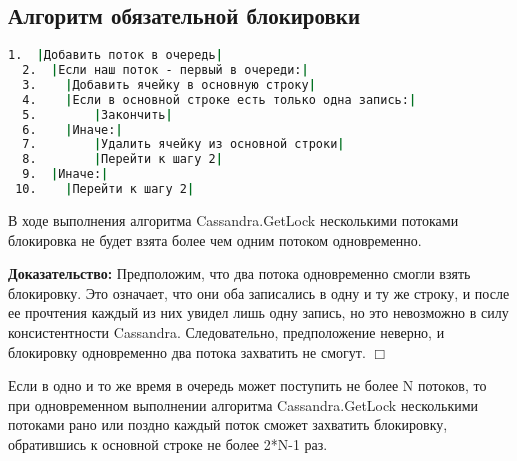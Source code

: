 \subsection{Алгоритм обязательной блокировки}

\begin{lstlisting}[language=csh,caption={Алгоритм Cassandra.GetLock(lockId, threadId)}]
  1.  |Добавить поток в очередь|
  2.  |Если наш поток - первый в очереди:|
  3.  	|Добавить ячейку в основную строку|
  4.  	|Если в основной строке есть только одна запись:|
  5.  		|Закончить|
  6.  	|Иначе:|
  7.  		|Удалить ячейку из основной строки|
  8.  		|Перейти к шагу 2|
  9.  |Иначе:|
 10.  	|Перейти к шагу 2|

\end{lstlisting}

\begin{theorem}
В ходе выполнения алгоритма Cassandra.GetLock несколькими потоками блокировка не будет взята более чем одним потоком одновременно.
\end{theorem}
\textbf{Доказательство:}
Предположим, что два потока одновременно смогли взять блокировку. Это означает, что они оба записались в одну и ту же строку, и после ее прочтения каждый из них увидел лишь одну запись, но это невозможно в силу консистентности Cassandra. Следовательно, предположение неверно, и блокировку одновременно два потока захватить не смогут.
$\Box$

\begin{theorem}
Если в одно и то же время в очередь может поступить не более N потоков, то при одновременном выполнении алгоритма Cassandra.GetLock несколькими потоками рано или поздно каждый поток сможет захватить блокировку, обратившись к основной строке не более 2*N-1 раз.
\end{theorem}
